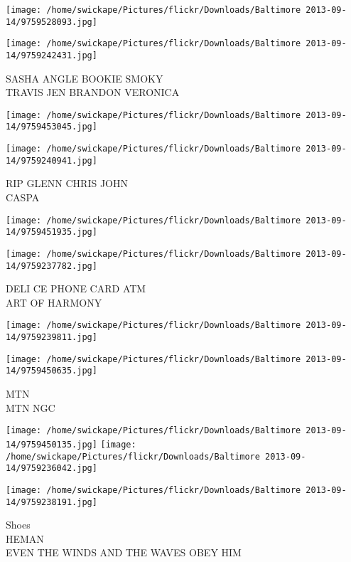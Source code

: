 \documentclass[10pt,letterpaper]{article}
\begin{document}
\texttt{[image: /home/swickape/Pictures/flickr/Downloads/Baltimore 2013-09-14/9759528093.jpg]}

\vspace{0.25in}
\texttt{[image: /home/swickape/Pictures/flickr/Downloads/Baltimore 2013-09-14/9759242431.jpg]}

SASHA ANGLE BOOKIE SMOKY\\
TRAVIS JEN BRANDON VERONICA
\pagebreak

\texttt{[image: /home/swickape/Pictures/flickr/Downloads/Baltimore 2013-09-14/9759453045.jpg]}

\vspace{0.25in}
\texttt{[image: /home/swickape/Pictures/flickr/Downloads/Baltimore 2013-09-14/9759240941.jpg]}

RIP GLENN CHRIS JOHN\\
CASPA
\pagebreak

\texttt{[image: /home/swickape/Pictures/flickr/Downloads/Baltimore 2013-09-14/9759451935.jpg]}

\vspace{0.25in}
\texttt{[image: /home/swickape/Pictures/flickr/Downloads/Baltimore 2013-09-14/9759237782.jpg]}

DELI CE PHONE CARD ATM\\
ART OF HARMONY
\pagebreak

\texttt{[image: /home/swickape/Pictures/flickr/Downloads/Baltimore 2013-09-14/9759239811.jpg]}

\vspace{0.25in}
\texttt{[image: /home/swickape/Pictures/flickr/Downloads/Baltimore 2013-09-14/9759450635.jpg]}

MTN\\
MTN NGC
\pagebreak

\texttt{[image: /home/swickape/Pictures/flickr/Downloads/Baltimore 2013-09-14/9759450135.jpg]}
\texttt{[image: /home/swickape/Pictures/flickr/Downloads/Baltimore 2013-09-14/9759236042.jpg]}

\vspace{0.25in}
\texttt{[image: /home/swickape/Pictures/flickr/Downloads/Baltimore 2013-09-14/9759238191.jpg]}

Shoes\\
HEMAN\\
EVEN THE WINDS AND THE WAVES OBEY HIM
\pagebreak
\end{document}
